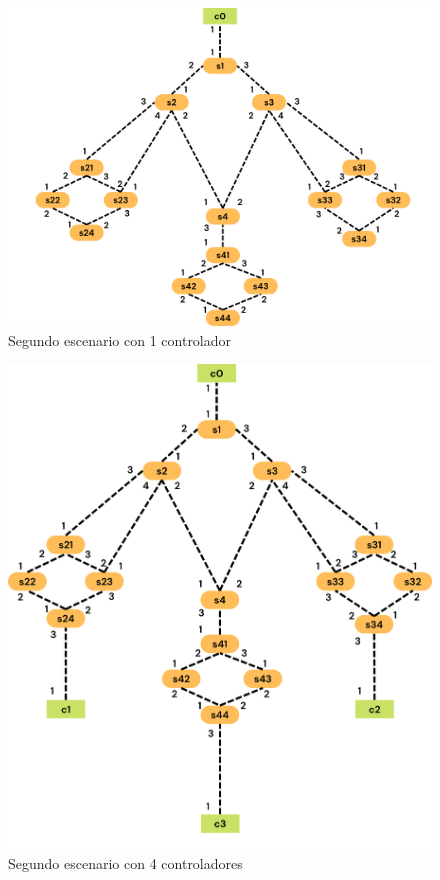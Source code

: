 \documentclass[a4paper, 12pt]{book}
\begin{document}
 	\begin{figure}[H]
 		\centering
 		\includegraphics[width=14cm, keepaspectratio]{img/escenario2-1}
 		\caption{Segundo escenario con 1 controlador}
 		\label{figura:escenario2-1c}
 	\end{figure}
 	
 	\begin{figure}[H]
 		\centering
 		\includegraphics[width=14cm, keepaspectratio]{img/escenario2-2}
 		\caption{Segundo escenario con 4 controladores}
 		\label{figura:escenario2-4c}
 	\end{figure}
 	
\end{document}
